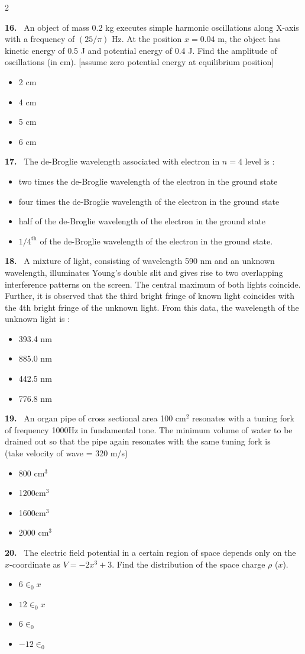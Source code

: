 \documentclass[10pt]{extarticle}
\newcommand{\qn}[1]{\par\smallskip\noindent\textbf{#1.}~}
\newenvironment{qoptions}{\begin{itemize}[leftmargin=1.8em,itemsep=1pt,topsep=2pt,label={}]}{\end{itemize}}
\newcommand{\opt}[2]{\item[(#1)] #2}
\begin{document}
\begin{multicols}{2}
\qn{16} An object of mass 0.2 kg executes simple harmonic oscillations along X-axis with a frequency of $(25/\pi)$ Hz. At the position $x=0.04$ m, the object has kinetic energy of 0.5 J and potential energy of 0.4 J. Find the amplitude of oscillations (in cm). [assume zero potential energy at equilibrium position]
\begin{qoptions}
\opt{A}{2 cm}
\opt{B}{4 cm}
\opt{C}{5 cm}
\opt{D}{6 cm}
\end{qoptions}

\qn{17} The de-Broglie wavelength associated with electron in $n=4$ level is :
\begin{qoptions}
\opt{A}{two times the de-Broglie wavelength of the electron in the ground state}
\opt{B}{four times the de-Broglie wavelength of the electron in the ground state}
\opt{C}{half of the de-Broglie wavelength of the electron in the ground state}
\opt{D}{$1/4^{\text{th}}$ of the de-Broglie wavelength of the electron in the ground state.}
\end{qoptions}

\qn{18} A mixture of light, consisting of wavelength 590 nm and an unknown wavelength, illuminates Young's double slit and gives rise to two overlapping interference patterns on the screen. The central maximum of both lights coincide. Further, it is observed that the third bright fringe of known light coincides with the 4th bright fringe of the unknown light. From this data, the wavelength of the unknown light is :
\begin{qoptions}
\opt{A}{393.4 nm}
\opt{B}{885.0 nm}
\opt{C}{442.5 nm}
\opt{D}{776.8 nm}
\end{qoptions}

\qn{19} An organ pipe of cross sectional area 100 cm$^2$ resonates with a tuning fork of frequency 1000Hz in fundamental tone. The minimum volume of water to be drained out so that the pipe again resonates with the same tuning fork is\\
(take velocity of wave = 320 m/s)
\begin{qoptions}
\opt{A}{800 cm$^3$}
\opt{B}{1200cm$^3$}
\opt{C}{1600cm$^3$}
\opt{D}{2000 cm$^3$}
\end{qoptions}

\qn{20} The electric field potential in a certain region of space depends only on the $x$-coordinate as $V=-2x^3+3$. Find the distribution of the space charge $\rho$ ($x$).
\begin{qoptions}
\opt{A}{$6\in_0x$}
\opt{B}{$12\in_0x$}
\opt{C}{$6\in_0$}
\opt{D}{$-12\in_0$}
\end{qoptions}


\end{multicols}
\end{document}
